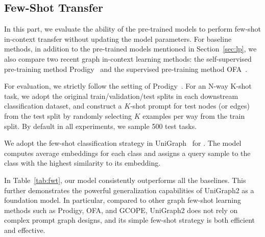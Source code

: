 \vspace{-2.8mm}
\subsection{Few-Shot Transfer}
In this part, we evaluate the ability of the pre-trained models to perform few-shot in-context transfer without updating the model parameters. 
For baseline methods, in addition to the pre-trained models mentioned in Section~\ref{sec:lp}, we also compare two recent graph in-context learning methods: the self-supervised pre-training method Prodigy~\cite{huang2024prodigy} and the supervised pre-training method OFA~\cite{liuone}.


For evaluation, we strictly follow the setting of Prodigy~\cite{huang2024prodigy}. 
For an N-way K-shot task, we adopt the original train/validation/test splits in each downstream classification dataset, and construct a $K$-shot prompt for test nodes (or edges) from the test split by randomly selecting $K$ examples per way from the train split. By default in all experiments, we sample 500 test tasks.

We adopt the few-shot classification strategy in UniGraph~\cite{he2024unigraphlearningunifiedcrossdomain} for \model. The model computes average embeddings for each class and assigns a query sample to the class with the highest similarity to its embedding.

In Table~\ref{tab:fwt}, our \model model consistently outperforms all the baselines. This further demonstrates the powerful generalization capabilities of UniGraph2 as a foundation model.
In particular, compared to other graph few-shot learning methods such as Prodigy, OFA, and GCOPE, UniGraph2 does not rely on complex prompt graph designs, and its simple few-shot strategy is both efficient and effective.


